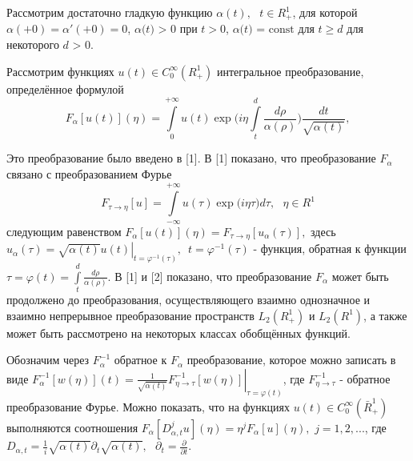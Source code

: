 




\vzmscaption

{\sloppy

Рассмотрим достаточно гладкую функцию $\alpha (t),\,\,\,\,t \in R_ + ^1 $,
для которой $\alpha ( + 0) = {\alpha }'( + 0) = 0$, $\alpha \mbox{(}t\mbox{)
> 0}$ при $t > 0$, $\alpha \mbox{(}t\mbox{) = const}$ для $t \geqslant d$ для
некоторого $d\mbox{ > 0}$.

Рассмотрим функциях $u(t) \in C_0^\infty (R_ + ^1 )$ интегральное
преобразование, определённое формулой
\begin{equation}
\label{eq4400}
F_\alpha [u(t)](\eta ) = \int\limits_0^{ + \infty } {u(t)\exp (i\eta }
\int\limits_t^d {\frac{d\rho }{\alpha (\rho )}} )\frac{dt}{\sqrt {\alpha
(t)} },
\end{equation}

Это преобразование было введено в [1]. В [1] показано, что преобразование
$F_\alpha $ связано с преобразованием Фурье
\[
F_{\tau \to \eta } [u] = \int\limits_{ - \infty }^{ + \infty } {u(\tau )\exp
(i\eta } \tau )d\tau ,\,\,\,\,\eta \in R^1
\]
следующим равенством $F_\alpha [u(t)](\eta ) = F_{\tau \to \eta } [u_\alpha
(\tau )],$ здесь $u_\alpha (\tau ) = \left. {\sqrt {\alpha (t)} u(t)}
\right|_{t = \varphi ^{ - 1}(\tau )} ,\,\,\,t = \varphi ^{ - 1}(\tau )$ -
функция, обратная к функции $\tau = \varphi (t) = \int\limits_t^d
{\frac{d\rho }{\alpha (\rho )}} .$ В [1] и [2] показано, что преобразование
$F_\alpha $ может быть продолжено до преобразования, осуществляющего взаимно
однозначное и взаимно непрерывное преобразование пространств $L_2 (R_ + ^1
)$ и $L_2 (R^1 )$, а также может быть рассмотрено на некоторых классах
обобщённых функций.

Обозначим через $F_\alpha ^{ - 1} $ обратное к $F_\alpha $ преобразование,
которое можно записать в виде $F_\alpha ^{ - 1} [w(\eta )](t) = \left.
{\frac{1}{\sqrt {\alpha (t)} }F_{\eta \to \tau }^{ - 1} [w(\eta )]}
\right|_{\tau = \varphi (t)} $, где $F_{\eta \to \tau }^{ - 1} $ - обратное
преобразование Фурье. Можно показать, что на функциях $u(t) \in C_0^\infty
(\bar {R}_ + ^1 )$ выполняются соотношения $F_\alpha [D_{\alpha ,t}^j
u](\eta ) = \eta ^jF_\alpha [u](\eta ),\,\,j = 1,2,...$, где $D_{\alpha ,t}
= \frac{1}{i}\sqrt {\alpha (t)} \partial _t \sqrt {\alpha (t)}
,\,\,\,\,\partial _t = \frac{\partial }{\partial t}.$

}

